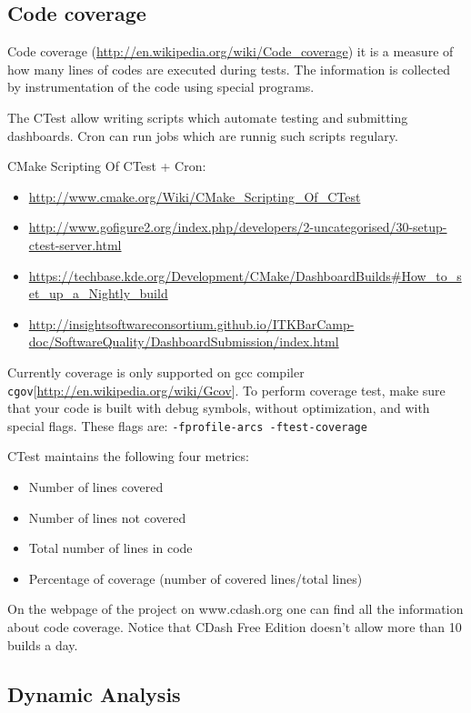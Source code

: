\documentclass[a4paper,10pt]{article}
\begin{document}
\subsection{Code coverage}

Code coverage (\url{http://en.wikipedia.org/wiki/Code_coverage}) it is a measure of how many lines of codes are executed during tests. The information is collected by instrumentation of the code using special programs.

The CTest allow writing scripts which automate testing and submitting dashboards. Cron can run jobs which are runnig such scripts regulary.

CMake Scripting Of CTest + Cron:
\begin{itemize}
 \item \url{http://www.cmake.org/Wiki/CMake_Scripting_Of_CTest}
\item\url{http://www.gofigure2.org/index.php/developers/2-uncategorised/30-setup-ctest-server.html}
\item\url{https://techbase.kde.org/Development/CMake/DashboardBuilds#How_to_set_up_a_Nightly_build}
\item\url{http://insightsoftwareconsortium.github.io/ITKBarCamp-doc/SoftwareQuality/DashboardSubmission/index.html}
\end{itemize}

Currently coverage is only supported on gcc compiler \texttt{cgov}[\url{http://en.wikipedia.org/wiki/Gcov}]. To perform coverage test, make sure that your code is built with debug symbols, without optimization, and with special flags. These flags are:
\texttt{-fprofile-arcs -ftest-coverage}

CTest maintains the following four metrics:
\begin{itemize}
\item Number of lines covered
\item Number of lines not covered
\item Total number of lines in code
\item Percentage of coverage (number of covered lines/total lines)
\end{itemize}


On the webpage of the project on www.cdash.org one can find all the information about code coverage.
Notice that CDash Free Edition doesn't allow more than 10 builds a day.


\subsection{Dynamic Analysis}
\end{document}
